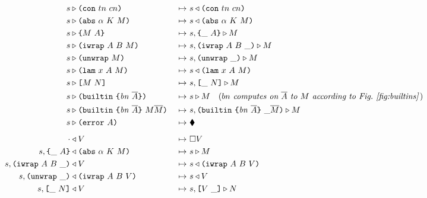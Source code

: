 \documentclass[../plutus-core-specification.tex]{subfiles}
\begin{document}
\begin{figure}[H]
\begin{subfigure}[c]{\linewidth}
\hspace{-1cm}\begin{minipage}{\linewidth}
\begin{alignat*}{2}
  s & \compute \con{tn}{cn}                 &~\mapsto~&  s \return \con{tn}{cn}\\
  s & \compute \abs{\alpha}{K}{M}           &~\mapsto~&  s \return \abs{\alpha}{K}{M}\\
  s & \compute \inst{M}{A}                  &~\mapsto~&  s,\inInstLeftFrame{A} \compute M\\
  s & \compute \wrap{A}{B}{M}               &~\mapsto~&  s,\inWrapRightFrame{A}{B} \compute M\\
  s & \compute \unwrap{M}                   &~\mapsto~&  s,\inUnwrapFrame{} \compute M\\
  s & \compute \lam{x}{A}{M}                &~\mapsto~&  s \return \lam{x}{A}{M}\\
  s & \compute \app{M}{N}                   &~\mapsto~&  s,\inAppLeftFrame{N} \compute M\\
  s & \compute \builtin{bn}{\repetition{A}}{\!\!}
                                            &~\mapsto~&  s \compute M
                                            \quad (\textit{$bn$ computes on $\repetition{A}$ to $M$ according to Fig.~\ref{fig:builtins}}\,)\\
  s & \compute \builtin{bn}{\repetition{A}}{M \repetition{M}}
                                            &~\mapsto~&  s,\inBuiltin{bn}{\repetition{A}}{}{\_}{\repetition{M}} \compute M\\
  s & \compute \error{A}                    &~\mapsto~&  \ckerror{}\\
  \\[-10pt] %
  \cdot& \return V                          &~\mapsto~&  \square V\\
  s,\inInstLeftFrame{A} & \return \abs{\alpha}{K}{M}
                                            &~\mapsto~&  s \compute M\\
  s,\inWrapRightFrame{A}{B} & \return V     &~\mapsto~&  s \return \wrap{A}{B}{V}\\
  s,\inUnwrapFrame{} & \return \wrap{A}{B}{V}
                                            &~\mapsto~&  s \return V\\
  s,\inAppLeftFrame{N} & \return V          &~\mapsto~&  s,\inAppRightFrame{V} \compute N\\

\end{alignat*}
\end{minipage}
\end{subfigure}
\end{figure}
\end{document}

